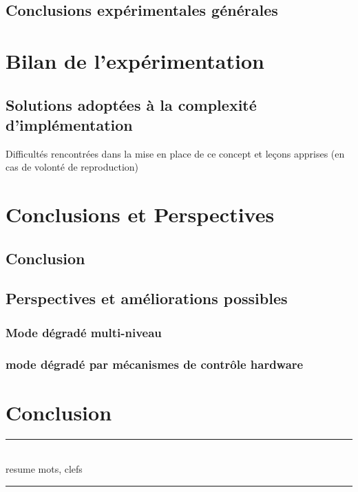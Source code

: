 \documentclass[french, a4paper, 11pt, twoside]{StyleThese}
\begin{document}
    \section{Conclusions expérimentales générales}
\chapter{Bilan de l'expérimentation}
    \section{Solutions adoptées à la complexité d'implémentation}
        Difficultés rencontrées dans la mise en place de ce concept et leçons apprises (en cas de volonté de reproduction)
\chapter{Conclusions et Perspectives}
    \section{Conclusion}
    \section{Perspectives et améliorations possibles}
        \subsection{Mode dégradé multi-niveau}
        \subsection{mode dégradé par mécanismes de contrôle hardware}
\chapter{Conclusion}


\appendix




%


\cleardoublepage
\begin{vcenterpage}
\noindent\rule[2pt]{\textwidth}{0.5pt}
\\
resume
mots, clefs
\\
\noindent\rule[2pt]{\textwidth}{0.5pt}
\end{vcenterpage}
\end{document}
